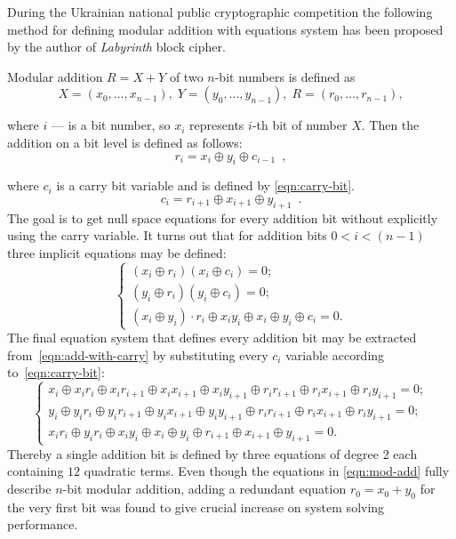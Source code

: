 During the Ukrainian national public cryptographic competition the following
method for defining modular addition with equations system has been proposed
by the author of \textit{Labyrinth} block cipher.

Modular addition $R = X + Y$ of two $n$-bit numbers is defined as
\begin{equation}
\label{eqn:add}
X = (x_0, \hdots, x_{n-1}), \;
Y = (y_0, \hdots, y_{n-1}), \;
R = (r_0, \hdots, r_{n-1}),
\end{equation}

where $i$ --- is a bit number, so $x_i$ represents $i$-th bit of number $X$.
Then the addition on a bit level is defined as follows:
\begin{equation}
\label{eqn:trivial-mod-add}
r_i = x_i \oplus y_i \oplus c_{i-1} \enspace,
\end{equation}

where $c_i$ is a carry bit variable and is defined by \eqref{eqn:carry-bit}.
\begin{equation}
\label{eqn:carry-bit}
c_i = r_{i+1} \oplus x_{i+1} \oplus y_{i+1} \enspace.
\end{equation}
The goal is to get null space equations for every addition bit without
explicitly using the carry variable. It turns out that for addition bits
$0 < i < (n - 1)$ three implicit equations may be defined:
\begin{equation}
\label{eqn:add-with-carry}
\left\{
	\begin{array}{ll}
        (x_i \oplus r_i) (x_i \oplus c_i) = 0; \\
        (y_i \oplus r_i) (y_i \oplus c_i) = 0; \\
        (x_i \oplus y_i) \cdot r_i \oplus x_i y_i \oplus x_i \oplus y_i \oplus c_i = 0.
	\end{array} \right.
\end{equation}
The final equation system that defines every addition bit may be extracted
from~\eqref{eqn:add-with-carry} by substituting every $c_i$ variable according
to~\ref{eqn:carry-bit}:
\begin{equation}
\label{eqn:mod-add}
\left\{
	\begin{array}{ll}
        x_i \oplus x_i r_i \oplus x_i r_{i+1} \oplus x_i x_{i+1} \oplus x_i y_{i+1} \oplus r_i r_{i+1} \oplus r_i x_{i+1} \oplus r_i y_{i+1} = 0; \\
        y_i \oplus y_i r_i \oplus y_i r_{i+1} \oplus y_i x_{i+1} \oplus y_i y_{i+1} \oplus r_i r_{i+1} \oplus r_i x_{i+1} \oplus r_i y_{i+1} = 0; \\
        x_i r_i \oplus y_i r_i \oplus x_i y_i \oplus x_i \oplus y_i \oplus r_{i+1} \oplus x_{i+1} \oplus y_{i+1} = 0.
	\end{array} \right.
\end{equation}
Thereby a single addition bit is defined by three equations of degree 2 each
containing $12$ quadratic terms. Even though the equations in
\eqref{eqn:mod-add} fully describe $n$-bit modular addition, adding a
redundant equation $r_0 = x_0 + y_0$ for the very first bit was found to give
crucial increase on system solving performance.



